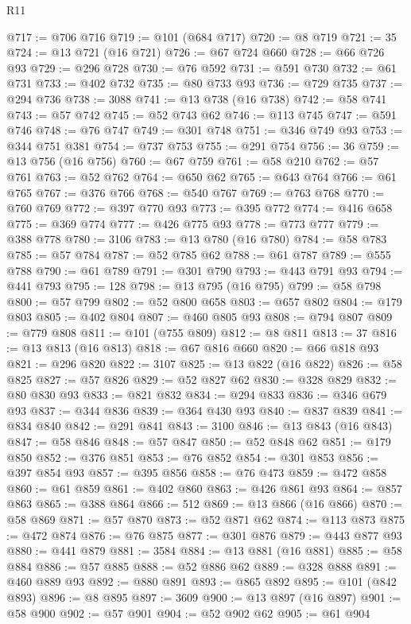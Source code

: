\begin{lexlean}{R11}
\begin{coremodule}
@717 := @706 @716
@719 := @101 (@684 @717)
@720 := @8 @719
@721 := 35
@724 := @13 @721 (@16 @721)
@726 := @67 @724 @660
@728 := @66 @726 @93
@729 := @296 @728
@730 := @76 @592
@731 := @591 @730
@732 := @61 @731
@733 := @402 @732
@735 := @80 @733 @93
@736 := @729 @735
@737 := @294 @736
@738 := 3088
@741 := @13 @738 (@16 @738)
@742 := @58 @741
@743 := @57 @742
@745 := @52 @743 @62
@746 := @113 @745
@747 := @591 @746
@748 := @76 @747
@749 := @301 @748
@751 := @346 @749 @93
@753 := @344 @751 @381
@754 := @737 @753
@755 := @291 @754
@756 := 36
@759 := @13 @756 (@16 @756)
@760 := @67 @759
@761 := @58 @210
@762 := @57 @761
@763 := @52 @762
@764 := @650 @62
@765 := @643 @764
@766 := @61 @765
@767 := @376 @766
@768 := @540 @767
@769 := @763 @768
@770 := @760 @769
@772 := @397 @770 @93
@773 := @395 @772
@774 := @416 @658
@775 := @369 @774
@777 := @426 @775 @93
@778 := @773 @777
@779 := @388 @778
@780 := 3106
@783 := @13 @780 (@16 @780)
@784 := @58 @783
@785 := @57 @784
@787 := @52 @785 @62
@788 := @61 @787
@789 := @555 @788
@790 := @61 @789
@791 := @301 @790
@793 := @443 @791 @93
@794 := @441 @793
@795 := 128
@798 := @13 @795 (@16 @795)
@799 := @58 @798
@800 := @57 @799
@802 := @52 @800 @658
@803 := @657 @802
@804 := @179 @803
@805 := @402 @804
@807 := @460 @805 @93
@808 := @794 @807
@809 := @779 @808
@811 := @101 (@755 @809)
@812 := @8 @811
@813 := 37
@816 := @13 @813 (@16 @813)
@818 := @67 @816 @660
@820 := @66 @818 @93
@821 := @296 @820
@822 := 3107
@825 := @13 @822 (@16 @822)
@826 := @58 @825
@827 := @57 @826
@829 := @52 @827 @62
@830 := @328 @829
@832 := @80 @830 @93
@833 := @821 @832
@834 := @294 @833
@836 := @346 @679 @93
@837 := @344 @836
@839 := @364 @430 @93
@840 := @837 @839
@841 := @834 @840
@842 := @291 @841
@843 := 3100
@846 := @13 @843 (@16 @843)
@847 := @58 @846
@848 := @57 @847
@850 := @52 @848 @62
@851 := @179 @850
@852 := @376 @851
@853 := @76 @852
@854 := @301 @853
@856 := @397 @854 @93
@857 := @395 @856
@858 := @76 @473
@859 := @472 @858
@860 := @61 @859
@861 := @402 @860
@863 := @426 @861 @93
@864 := @857 @863
@865 := @388 @864
@866 := 512
@869 := @13 @866 (@16 @866)
@870 := @58 @869
@871 := @57 @870
@873 := @52 @871 @62
@874 := @113 @873
@875 := @472 @874
@876 := @76 @875
@877 := @301 @876
@879 := @443 @877 @93
@880 := @441 @879
@881 := 3584
@884 := @13 @881 (@16 @881)
@885 := @58 @884
@886 := @57 @885
@888 := @52 @886 @62
@889 := @328 @888
@891 := @460 @889 @93
@892 := @880 @891
@893 := @865 @892
@895 := @101 (@842 @893)
@896 := @8 @895
@897 := 3609
@900 := @13 @897 (@16 @897)
@901 := @58 @900
@902 := @57 @901
@904 := @52 @902 @62
@905 := @61 @904

\end{coremodule}
\end{lexlean}
